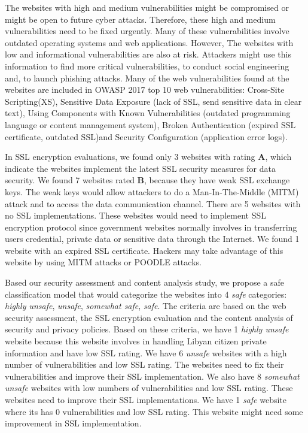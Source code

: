\documentclass[conference]{IEEEtran}
\begin{document}
The websites with high and medium vulnerabilities might be
compromised or might be open to future cyber attacks.
Therefore, these high and medium vulnerabilities need to be
fixed urgently. Many of these vulnerabilities involve
outdated operating systems and web applications. However,
The websites with low and informational vulnerabilities are
also at risk. Attackers might use this information to find
more critical vulnerabilities, to conduct social engineering
and, to launch phishing attacks. Many of the web
vulnerabilities found at the websites are included in OWASP 2017 top 10 web vulnerabilities: Cross-Site Scripting(XS), Sensitive Data
Exposure (lack of SSL, send sensitive data in clear text),
Using Components with Known Vulnerabilities (outdated
programming language or content management system), Broken
Authentication (expired SSL certificate, outdated SSL)and
Security Configuration (application error logs).

In SSL encryption evaluations, we found only 3 websites with
rating \textbf{A}, which indicate the websites implement the
latest SSL security measures for data security. We found 7
websites rated \textbf{B}, because they have weak SSL
exchange keys. The weak keys would allow attackers to do a
Man-In-The-Middle (MITM) attack and to access the data
communication channel. There are 5 websites with no SSL
implementations. These websites would need to implement SSL
encryption protocol since government websites normally
involves in transferring users credential, private data or
sensitive data through the Internet. We found 1 website with
an expired SSL certificate. Hackers may take advantage of this
website by using MITM attacks or POODLE attacks.

Based our security assessment and content analysis study, we propose
a safe classification model that would categorize the websites into
4 \emph{safe} categories: \emph{highly
	unsafe}, \emph{unsafe}, \emph{somewhat safe}, \emph{safe}.
The criteria are based on the web security assessment, the SSL
encryption evaluation and the content analysis of security and
privacy policies. Based on these criteria, we have 1
\emph{highly unsafe} website because this website involves
in handling Libyan citizen private information and have low
SSL rating. We have 6 \emph{unsafe} websites with a high
number of vulnerabilities and low SSL rating. The websites
need to fix their vulnerabilities and improve their SSL
implementation. We also have 8 \emph{somewhat unsafe}
websites with low numbers of vulnerabilities and low SSL
rating. These websites need to improve their SSL
implementations. We have 1 \emph{safe} website where its has
0 vulnerabilities and low SSL rating. This website might
need some improvement in SSL implementation.  
\end{document}
